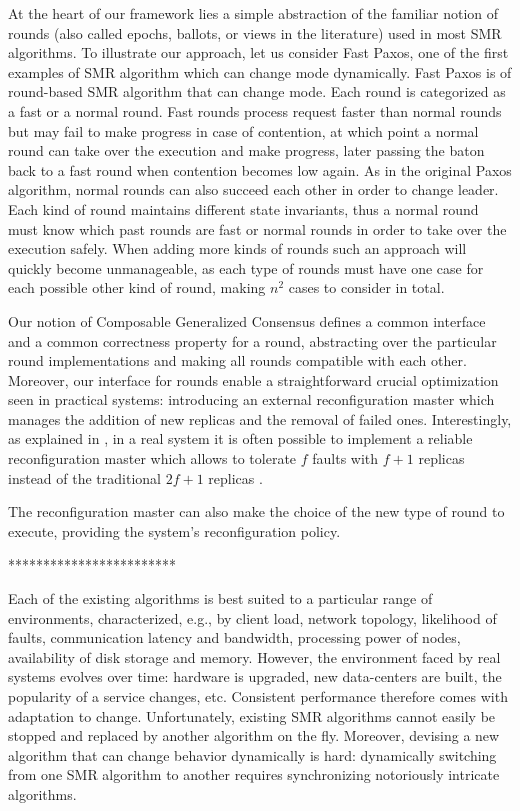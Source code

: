 At the heart of our framework lies a simple abstraction of the familiar notion of rounds (also called epochs, ballots, or views in the literature) used in most SMR algorithms. To illustrate our approach, let us consider Fast Paxos, one of the first examples of SMR algorithm which can change mode dynamically.
Fast Paxos is of round-based SMR algorithm that can change mode. Each round is categorized as a fast or a normal round. Fast rounds process request faster than normal rounds but may fail to make progress in case of contention, at which point a normal round can take over the execution and make progress, later passing the baton back to a fast round when contention becomes low again. As in the original Paxos algorithm, normal rounds can also succeed each other in order to change
leader. Each kind of round maintains different state invariants, thus a normal round must know which past rounds are fast or normal rounds in order to take over the execution safely. When adding more kinds of rounds such an approach will quickly become unmanageable, as each type of rounds must have one case for each possible other kind of round, making $n^2$ cases to consider in total.

Our notion of Composable Generalized Consensus defines a common interface and a common correctness property for a round, abstracting over the particular round implementations and making all rounds compatible with each other. 
Moreover, our interface for rounds enable a straightforward crucial optimization seen in practical systems: introducing an external reconfiguration master which manages the addition of new replicas and the removal of failed ones. Interestingly, as explained in \cite{LamportMalkhiZhou09VerticalPaxosPrimarybackupReplication}, in a real system it is often possible to implement a reliable reconfiguration master which allows to tolerate $f$ faults with $f+1$ replicas instead of the traditional $2f+1$ replicas .

The reconfiguration master can also make the choice of the new type of round to execute, providing the system's reconfiguration policy. 

************************

Each of the existing algorithms is best suited to a particular range
of environments, characterized, e.g., by client load, network
topology, likelihood of faults, communication latency and bandwidth, processing
power of nodes, availability of disk storage and memory.
However, the environment faced by real systems evolves over time:
hardware is upgraded, new data-centers are built, the popularity of a
service changes, etc.  Consistent performance therefore comes with
adaptation to change.  Unfortunately, existing SMR algorithms cannot easily be
stopped and replaced by another algorithm on the fly. Moreover,
devising a new algorithm that can change behavior dynamically is hard:
dynamically switching from one SMR algorithm to another requires
synchronizing notoriously intricate algorithms.

